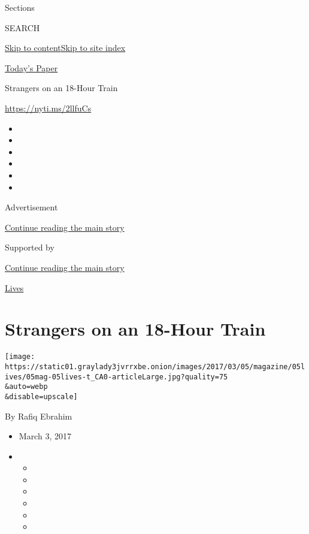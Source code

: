 Sections

SEARCH

\protect\hyperlink{site-content}{Skip to
content}\protect\hyperlink{site-index}{Skip to site index}

\href{https://myaccount.nytimes3xbfgragh.onion/auth/login?response_type=cookie\&client_id=vi}{}

\href{https://www.nytimes3xbfgragh.onion/section/todayspaper}{Today's
Paper}

Strangers on an 18-Hour Train

\url{https://nyti.ms/2llfuCs}

\begin{itemize}
\item
\item
\item
\item
\item
\item
\end{itemize}

Advertisement

\protect\hyperlink{after-top}{Continue reading the main story}

Supported by

\protect\hyperlink{after-sponsor}{Continue reading the main story}

\href{/column/lives}{Lives}

\hypertarget{strangers-on-an-18-hour-train}{%
\section{Strangers on an 18-Hour
Train}\label{strangers-on-an-18-hour-train}}

\texttt{[image: https://static01.graylady3jvrrxbe.onion/images/2017/03/05/magazine/05lives/05mag-05lives-t\_CA0-articleLarge.jpg?quality=75\\\&auto=webp\\\&disable=upscale]}

By Rafiq Ebrahim

\begin{itemize}
\item
  March 3, 2017
\item
  \begin{itemize}
  \item
  \item
  \item
  \item
  \item
  \item
  \end{itemize}
\end{itemize}


